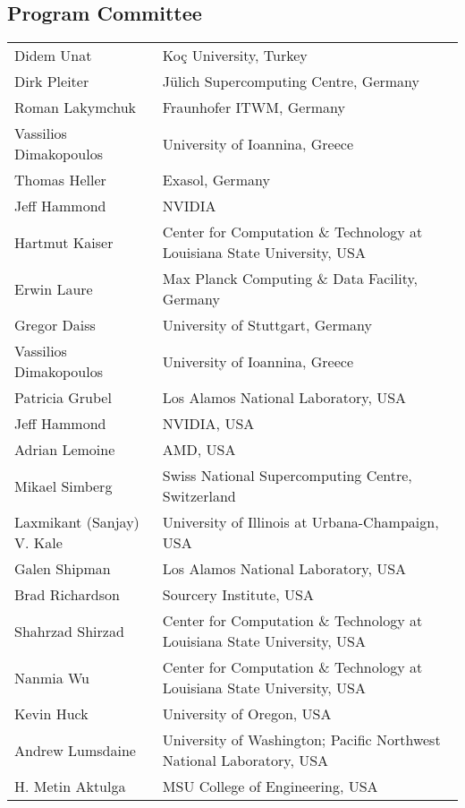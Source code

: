 \documentclass{llncs}
\begin{document}

\subsection*{Program Committee}
\begin{tabular}{@{}p{5cm}@{}p{7.2cm}@{}}
Didem Unat & Koç University, Turkey\\
Dirk Pleiter & Jülich Supercomputing Centre, Germany \\
Roman Lakymchuk & Fraunhofer ITWM, Germany \\
Vassilios Dimakopoulos & University of Ioannina, Greece \\
Thomas Heller & Exasol, Germany \\
Jeff Hammond & NVIDIA \\
Hartmut Kaiser & Center for Computation \& Technology at Louisiana State University, USA \\
Erwin Laure & Max Planck Computing \& Data Facility, Germany \\
Gregor Daiss & University of Stuttgart, Germany \\
Vassilios Dimakopoulos & University of Ioannina, Greece \\
Patricia Grubel & Los Alamos National Laboratory, USA \\
Jeff Hammond & NVIDIA, USA \\
Adrian Lemoine & AMD, USA \\
Mikael Simberg & Swiss National Supercomputing Centre, Switzerland \\
Laxmikant (Sanjay) V. Kale & University of Illinois at Urbana-Champaign, USA \\
Galen Shipman & Los Alamos National Laboratory, USA \\
Brad Richardson & Sourcery Institute, USA \\
Shahrzad Shirzad & Center for Computation \& Technology at Louisiana State University, USA \\
Nanmia Wu & Center for Computation \& Technology at Louisiana State University, USA \\
Kevin Huck & University of Oregon, USA \\
Andrew Lumsdaine & University of Washington; Pacific Northwest National Laboratory, USA \\
H. Metin Aktulga & MSU College of Engineering, USA
\end{tabular}
\end{document}
